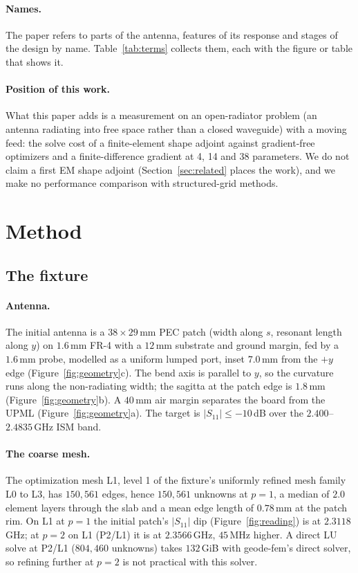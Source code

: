 \documentclass{anvil-paper}
\newcommand{\PL}{P2/L1}
\begin{document}
\paragraph{Names.}
The paper refers to parts of the antenna, features of its response and
stages of the design by name. Table~\ref{tab:terms} collects them, each with
the figure or table that shows it.

\paragraph{Position of this work.}
What this paper adds is a measurement on an open-radiator problem (an antenna
radiating into free space rather than a closed waveguide) with a moving feed: the solve cost of a finite-element shape adjoint against
gradient-free optimizers and a finite-difference gradient at 4, 14 and 38
parameters. We do not claim a first EM shape adjoint (Section~\ref{sec:related} places
the work), and we make no performance comparison with structured-grid
methods.

\section{Method}
\label{sec:method}

\subsection{The fixture}
\label{sec:fixture}

\paragraph{Antenna.}
The initial antenna is a $38\times29$\,mm PEC patch (width along $s$,
resonant length along $y$) on $1.6$\,mm FR-4 with a $12$\,mm substrate and
ground margin, fed by a $1.6$\,mm probe, modelled as a uniform lumped port,
inset $7.0$\,mm from the $+y$ edge (Figure~\ref{fig:geometry}c). The bend axis
is parallel to $y$, so the curvature runs along the non-radiating width; the
sagitta at the patch edge is $1.8$\,mm (Figure~\ref{fig:geometry}b). A
$40$\,mm air margin separates the board from the UPML
(Figure~\ref{fig:geometry}a). The target is $|S_{11}| \le -10$\,dB over the
$2.400$--$2.4835$\,GHz ISM band.

\paragraph{The coarse mesh.}
The optimization mesh L1, level 1 of the fixture's uniformly refined mesh
family L0 to L3, has $150{,}561$ edges, hence $150{,}561$ unknowns at
$p = 1$, a median of $2.0$ element layers through the slab and a mean edge length of
$0.78$\,mm at the patch rim. On L1 at $p = 1$ the initial patch's
$|S_{11}|$ dip (Figure~\ref{fig:reading}) is at $2.3118$\,GHz; at $p = 2$ on L1 (\PL) it is at
$2.3566$\,GHz, $45$\,MHz higher. A direct LU solve at \PL{} ($804{,}460$
unknowns) takes $132$\,GiB with geode-fem's direct solver, so refining
further at $p = 2$ is not practical with this solver.
\end{document}
